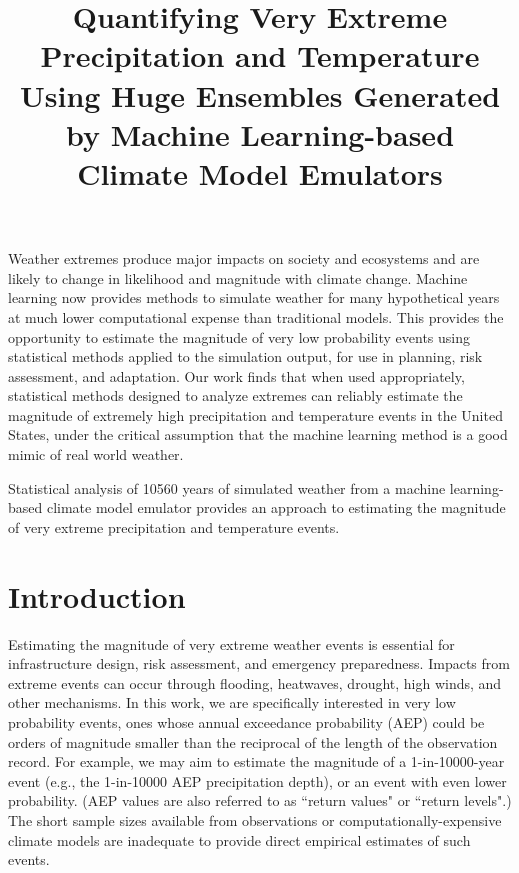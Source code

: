 \documentclass{ametsocV6.1}
\title{Quantifying Very Extreme Precipitation and Temperature Using Huge Ensembles Generated by Machine Learning-based Climate Model Emulators}
\affiliation{\aff{a}Department of Statistics, University of California, Berkeley, California, United States\\ \aff{b}Department of Statistics, Colorado State University, Fort Collins, Colorado, United States}
\begin{document}
\maketitle 
\statement   
Weather extremes produce major impacts on society and ecosystems and are likely to change in likelihood and magnitude with climate change. Machine learning now provides methods to simulate weather for many hypothetical years at much lower computational expense than traditional models. This provides the opportunity to estimate the magnitude of very low probability events using statistical methods applied to the simulation output, for use in planning, risk assessment, and adaptation. Our work finds that when used appropriately, statistical methods designed to analyze extremes can reliably estimate the magnitude of extremely high precipitation and temperature events in the United States, under the critical assumption that the machine learning method is a good mimic of real world weather.  

\capsule 
Statistical analysis of 10560 years of simulated weather from a machine learning-based climate model emulator provides an approach to estimating the magnitude of very extreme precipitation and temperature events.

\section{Introduction}

Estimating the magnitude of very extreme weather events is essential for infrastructure design, 
risk assessment, and emergency preparedness.  %
Impacts from extreme events can occur through flooding, heatwaves, drought, high winds, and other mechanisms.
In this work, we are specifically interested in very low probability events, ones whose annual exceedance probability (AEP) could be orders of magnitude smaller than the reciprocal of the length of the observation record.
For example, we may aim to estimate the magnitude of a 1-in-10000-year event (e.g., the 1-in-10000 AEP precipitation depth), or an event with even lower probability. (AEP values are also referred to as ``return values" or ``return levels".)
The short sample sizes available from observations or computationally-expensive climate models are inadequate to provide direct empirical estimates of such events. 
\end{document}
